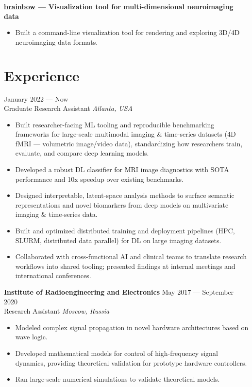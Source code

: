 \documentclass[11pt,a4paper]{article}
\begin{document}
\noindent\textbf{\href{https://pypi.org/project/brainbow/}{brainbow} --- Visualization tool for multi-dimensional neuroimaging data}\\
[-2em]
\begin{itemize}[leftmargin=*,noitemsep]
    \item Built a command-line visualization tool for rendering and exploring 3D/4D neuroimaging data formats.
\end{itemize}

\section*{Experience}
 \hfill January 2022 --- Now\\
Graduate Research Assistant \hfill \textit{Atlanta, USA}\\
[-2em]
\begin{itemize}[leftmargin=*,noitemsep]
    \item Built researcher-facing ML tooling and reproducible benchmarking frameworks for large-scale multimodal imaging \& time-series datasets (4D fMRI --- volumetric image/video data), standardizing how researchers train, evaluate, and compare deep learning models.
    \item Developed a robust DL classifier for MRI image diagnostics with SOTA performance and 10x speedup over existing benchmarks.
    \item Designed interpretable, latent-space analysis methods to surface semantic representations and novel biomarkers from deep models on multivariate imaging \& time-series data.
    \item Built and optimized distributed training and deployment pipelines (HPC, SLURM, distributed data parallel) for DL on large imaging datasets.
    \item Collaborated with cross-functional AI and clinical teams to translate research workflows into shared tooling; presented findings at internal meetings and international conferences.
\end{itemize}

\noindent\textbf{Institute of Radioengineering and Electronics} \hfill May 2017 --- September 2020\\
Research Assistant \hfill \textit{Moscow, Russia}\\
[-2em]
\begin{itemize}[leftmargin=*,noitemsep]
    \item Modeled complex signal propagation in novel hardware architectures based on wave logic.
    \item Developed mathematical models for control of high-frequency signal dynamics, providing theoretical validation for prototype hardware controllers.
    \item Ran large-scale numerical simulations to validate theoretical models.
\end{itemize}
\end{document}
